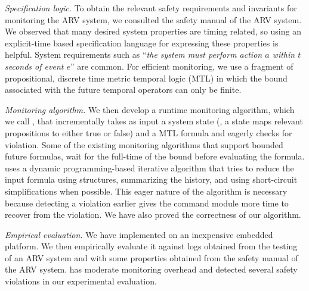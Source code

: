 \emph{Specification logic. }
To obtain the relevant safety requirements and invariants for monitoring the ARV system, we consulted the safety 
manual of the ARV system. We observed that many desired system properties are timing related, so using an explicit-time 
based specification language for expressing these properties is helpful. System requirements such as ``\emph{the system must 
perform action $a$ within $t$ seconds of event $e$}'' are common. For efficient monitoring, we use a fragment of propositional, discrete time  
metric temporal logic (MTL)\cite{MTL} in which the bound associated with the future temporal operators can only be finite. 

\emph{Monitoring algorithm. }
We then develop a runtime monitoring algorithm, which we call \monitor, that incrementally takes as input a system state (\ie, a 
state maps relevant propositions to either true or false) and a MTL formula and eagerly checks for violation. Some of the existing 
monitoring algorithms that support bounded future formulas, wait for the full-time of the bound before evaluating the formula. 
\monitor uses a dynamic programming-based iterative algorithm that tries to reduce the input formula using  structures, summarizing the history, 
and using short-circuit simplifications when possible. This eager nature of the algorithm is necessary because detecting a violation earlier 
gives the command module more time to recover from the violation. We have also proved the correctness of our algorithm. 

\emph{Empirical evaluation. } 
We have  implemented \monitor on an inexpensive embedded platform. We then empirically evaluate it against logs obtained from 
the testing of an ARV system and with some properties obtained from the safety manual of the ARV system. \monitor has moderate  
monitoring overhead and detected several safety violations in our experimental evaluation.  





